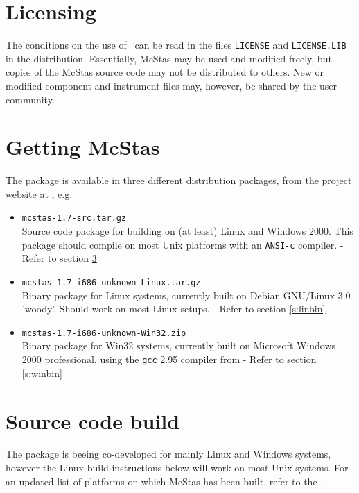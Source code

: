 \label{s:install}
\section{Licensing}
The conditions on the use of \MCS\ can be read in the files
\verb+LICENSE+ and \verb+LICENSE.LIB+ in the distribution. Essentially,
McStas may be used and modified freely, but copies of the McStas source code 
may not be distributed to others. 
New or modified component and instrument files may, however, be shared by 
the user community.

\section{Getting McStas}
\label{s:obtain}
The  package is
available in three different distribution packages, from the project
website at
, e.g.
\begin{itemize}
\item{\texttt{mcstas-1.7-src.tar.gz}\\Source code package for
    building  on
    (at least) Linux and Windows 2000. This package should compile on
    most Unix platforms with an \texttt{ANSI-c} compiler. - Refer to section \ref{s:src}}
\item{\texttt{mcstas-1.7-i686-unknown-Linux.tar.gz}\\Binary package
  for Linux systems, currently built on Debian GNU/Linux 3.0 'woody'. 
  Should work on most Linux setups.
 - Refer to section \ref{s:linbin}}
\item{\texttt{mcstas-1.7-i686-unknown-Win32.zip}\\Binary package
  for Win32 systems, currently built on Microsoft Windows 2000
  professional, using the \texttt{gcc} 2.95 compiler from 
   - Refer to section \ref{s:winbin}}
\end{itemize}
\section{Source code build}
\label{s:src}
The  package is
beeing co-developed for mainly Linux and Windows systems, however 
the Linux build instructions below will work on most Unix
systems. For an updated list of platforms on which McStas has been
built, refer to the .
